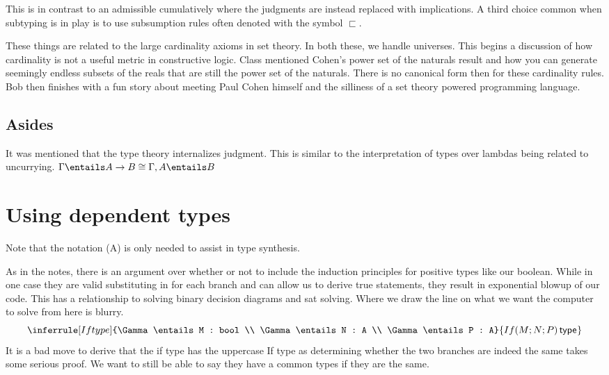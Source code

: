 \documentclass[11pt]{article}
\begin{document}
This is in contrast to an admissible cumulatively where the judgments are instead replaced with implications. A third choice common when subtyping is in play is to use subsumption rules often denoted with the symbol $\sqsubset$.

These things are related to the large cardinality axioms in set theory. In both these, we handle universes. This begins a discussion of how cardinality is not a useful metric in constructive logic. Class mentioned Cohen's power set of the naturals result and how you can generate seemingly endless subsets of the reals that are still the power set of the naturals. There is no canonical form then for these cardinality rules. Bob then finishes with a fun story about meeting Paul Cohen himself and the silliness of a set theory powered programming language.

\subsection*{Asides}
It was mentioned that the type theory internalizes judgment. This is similar to the interpretation of types over lambdas being related to uncurrying. $\Gamma \entails A \rightarrow B \cong \Gamma, A \entails B$
\section*{Using dependent types}
\begin{mathpar}



\end{mathpar}
Note that the notation (A) is only needed to assist in type synthesis.
\begin{mathpar}
\end{mathpar}
As in the notes, there is an argument over whether or not to include the induction principles for positive types like our boolean. While in one case they are valid substituting in for each branch and can allow us to derive true statements, they result in exponential blowup of our code. This has a relationship to solving binary decision diagrams and sat solving. Where we draw the line on what we want the computer to solve from here is blurry.
$$\inferrule[If type]{\Gamma \entails M : bool \\ \Gamma \entails N : A \\ \Gamma \entails P : A}{\isTp{If(M; N; P)}}$$
It is a bad move to derive that the if type has the uppercase If type as determining whether the two branches are indeed the same takes some serious proof. We want to still be able to say they have a common types if they are the same.
\end{document}
